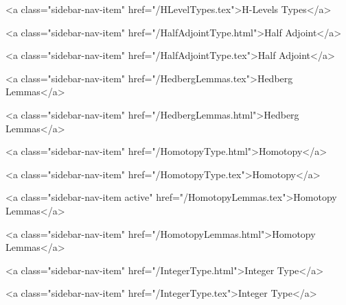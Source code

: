       
        
          <a class="sidebar-nav-item" href="/HLevelTypes.tex">H-Levels Types</a>
        
      
    
      
        
          <a class="sidebar-nav-item" href="/HalfAdjointType.html">Half Adjoint</a>
        
      
    
      
        
          <a class="sidebar-nav-item" href="/HalfAdjointType.tex">Half Adjoint</a>
        
      
    
      
        
          <a class="sidebar-nav-item" href="/HedbergLemmas.tex">Hedberg Lemmas</a>
        
      
    
      
        
          <a class="sidebar-nav-item" href="/HedbergLemmas.html">Hedberg Lemmas</a>
        
      
    
      
        
          <a class="sidebar-nav-item" href="/HomotopyType.html">Homotopy</a>
        
      
    
      
        
          <a class="sidebar-nav-item" href="/HomotopyType.tex">Homotopy</a>
        
      
    
      
        
          <a class="sidebar-nav-item active" href="/HomotopyLemmas.tex">Homotopy Lemmas</a>
        
      
    
      
        
          <a class="sidebar-nav-item" href="/HomotopyLemmas.html">Homotopy Lemmas</a>
        
      
    
      
        
          <a class="sidebar-nav-item" href="/IntegerType.html">Integer Type</a>
        
      
    
      
        
          <a class="sidebar-nav-item" href="/IntegerType.tex">Integer Type</a>
        
      
    
